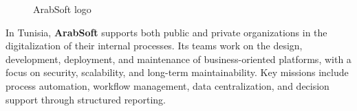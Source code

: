 \vspace{6pt}

\begin{figure}[H]
  \centering
  \caption{ArabSoft logo}
\end{figure}

\vspace{6pt}


{\fontsize{12}{18}\selectfont
\setlength{\parindent}{1.2cm}
\setlength{\parskip}{6pt}

\indent In Tunisia, \textbf{ArabSoft} supports both public and private organizations in the digitalization of their internal processes. Its teams work on the design, development, deployment, and maintenance of business-oriented platforms, with a focus on security, scalability, and long-term maintainability. Key missions include process automation, workflow management, data centralization, and decision support through structured reporting.

}

\vspace{6pt}



